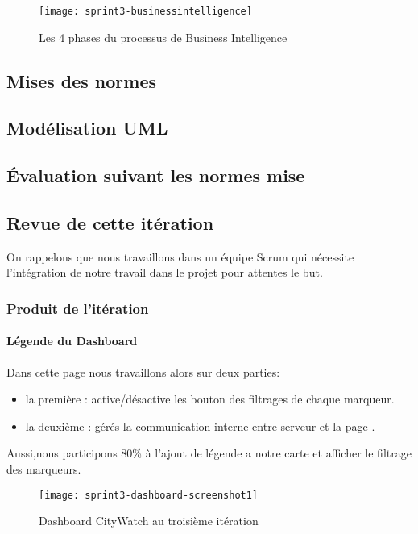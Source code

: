 \begin{figure}[htbp]
  \centering
  \texttt{[image: sprint3-businessintelligence]}
  \caption{Les 4 phases du processus de Business Intelligence}
  \label{fig:sprint3-businessintelligence}
\end{figure}


\subsection{Mises des normes}

\subsection{Modélisation UML}

\subsection{Évaluation suivant les normes mise}
\clearpage
\subsection{Revue de cette itération}
On rappelons que nous travaillons dans un équipe Scrum qui nécessite 
l'intégration de notre travail dans le projet pour attentes le but.
\subsubsection{Produit de l'itération}
\paragraph{Légende du Dashboard}
Dans cette page nous travaillons alors sur deux parties:
\begin{itemize}
 \item la première : active/désactive les bouton des filtrages de chaque marqueur.
 \item la deuxième : gérés la communication interne entre serveur et la page .
 \end{itemize}
Aussi,nous participons 80\% à l'ajout de légende a notre carte
et afficher le filtrage des marqueurs.\\

\begin{figure}[htbp]
  \centering
  \texttt{[image: sprint3-dashboard-screenshot1]}
  \caption{Dashboard CityWatch au troisième itération}
  \label{fig:sprint3-dashboard-screenshot1}
\end{figure}
\clearpage
